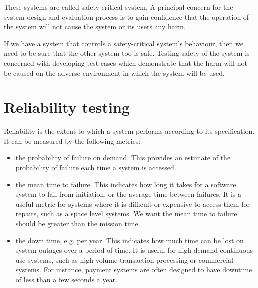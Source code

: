 \documentclass[a4paper, openany]{memoir}
\begin{document}
These systems are called safety-critical system. A principal concern for the system design and evaluation process is to gain confidence that the operation of the system will not cause the system or its users any harm. 

If we have a system that controls a safety-critical system's behaviour, then we need to be sure that the other system too is safe. Testing safety of the system is concerned with developing test cases which demonstrate that the harm will not be caused on the adverse environment in which the system will be used.

\section{Reliability testing}
Reliability is the extent to which a system performs according to its specification. It can be measured by the following metrics:
\begin{itemize}
    \item the probability of failure on demand. This provides an estimate of the probability of failure each time a system is accessed.
    \item the mean time to failure. This indicates how long it takes for a software system to fail from initiation, or the average time between failures. It is a useful metric for systems where it is difficult or expensive to access them for repairs, such as a space level systems. We want the mean time to failure should be greater than the mission time.
    \item the down time, e.g. per year. This indicates how much time can be lost on system outages over a period of time. It is useful for high demand continuous use systems, such as high-volume transaction processing or commercial systems. For instance, payment systems are often designed to have downtime of less than a few seconds a year.
\end{itemize}
\end{document}
